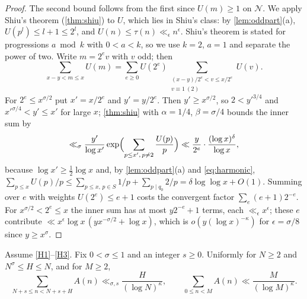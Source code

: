 \documentclass[11pt]{article}
\begin{document}
\begin{proof}
The second bound follows from the first since $U(m)\ge1$ on $\mathcal N$. We
apply Shiu's theorem (\cref{thm:shiu}) to $U$, which lies in Shiu's class: by
\cref{lem:oddpart}(a), $U(p^l)\le l+1\le2^l$, and $U(n)\le\tau(n)\ll_\epsilon n^\epsilon$.
Shiu's theorem is stated for progressions $a\bmod k$ with $0<a<k$, so we use
$k=2$, $a=1$ and separate the power of two. Write $m=2^ev$ with $v$ odd; then
\[
\sum_{x-y<m\le x}U(m)=\sum_{e\ge0}U(2^e)\sum_{\substack{(x-y)/2^e<v\le x/2^e\\ v\equiv1\ (2)}}U(v).
\]
For $2^e\le x^{\sigma/2}$ put $x'=x/2^e$ and $y'=y/2^e$. Then
$y'\ge x^{\sigma/2}$, so $2<y'^{3/4}$ and $x'^{\sigma/4}<y'\le x'$ for large $x$;
\cref{thm:shiu} with $\alpha=1/4$, $\beta=\sigma/4$ bounds the inner sum by
\[
\ll_\sigma\frac{y'}{\log x'}\exp\Bigl(\sum_{p\le x',\,p\ne2}\frac{U(p)}{p}\Bigr)
\ll\frac{y}{2^e}\cdot\frac{(\log x)^{\delta}}{\log x},
\]
because $\log x'\ge\frac12\log x$ and, by \cref{lem:oddpart}(a) and \eqref{eq:harmonic},
$\sum_{p\le x}U(p)/p\le\sum_{p\le x,\,p\in S}1/p+\sum_{p\mid q_0}2/p=\delta\log\log x+O(1)$.
Summing over $e$ with weights $U(2^e)\le e+1$ costs the convergent factor
$\sum_e(e+1)2^{-e}$. For $x^{\sigma/2}<2^e\le x$ the inner sum has at most
$y2^{-e}+1$ terms, each $\ll_\epsilon x^{\epsilon}$; these $e$ contribute
$\ll x^{\epsilon}\log x\,(yx^{-\sigma/2}+\log x)$, which is
$o(y(\log x)^{-\kappa})$ for $\epsilon=\sigma/8$ since $y\ge x^\sigma$.
\end{proof}

\begin{lemma}\label{lem:windows}
Assume \ref{H1}--\ref{H3}. Fix $0<\sigma\le1$ and an integer $s\ge0$. Uniformly
for $N\ge2$ and $N^\sigma\le H\le N$, and for $M\ge2$,
\[
\sum_{N+s\le n<N+s+H}A(n)\ll_{\sigma,s}\frac{H}{(\log N)^{\kappa}},\qquad
\sum_{0\le n<M}A(n)\ll\frac{M}{(\log M)^{\kappa}} .
\]
\end{lemma}
\end{document}
